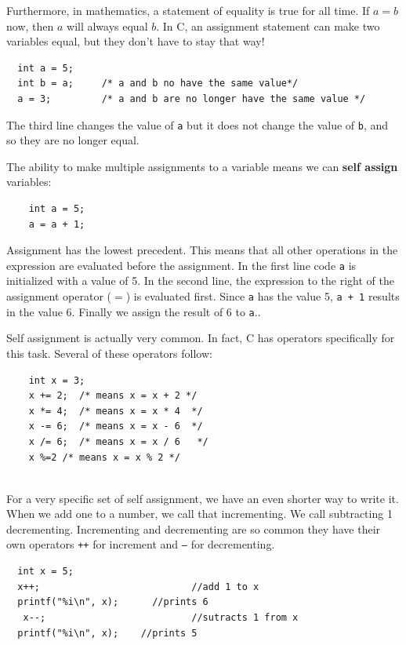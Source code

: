 Furthermore, in mathematics, a statement of equality is true
for all time.  If $a = b$ now, then $a$ will always equal $b$.
In C, an assignment statement can make two variables equal,
but they don't have to stay that way!

\begin{verbatim}
  int a = 5;
  int b = a;     /* a and b no have the same value*/
  a = 3;         /* a and b are no longer have the same value */
\end{verbatim}
%
The third line changes the value of {\tt a} but it does not
change the value of {\tt b}, and so they are no longer equal.

The ability to make multiple assignments to a variable means we can {\bf self assign} variables:

\begin{verbatim}
	int a = 5;  
	a = a + 1;       
\end{verbatim}
%
Assignment has the lowest precedent. 
This means that all other operations in the expression are evaluated before the assignment. 
In the first line code {\tt a} is initialized with a value of 5. In the second line, 
the expression  to the right of the assignment operator ($=$) is evaluated first. 
Since {\tt a} has the value 5, {\tt a + 1}  results in the value 6.
Finally we assign the result of 6 to {\tt a}..


Self assignment is actually very common. In fact, C has operators specifically for this task.
Several of these operators follow:

 \begin{verbatim}
 	int x = 3;
 	x += 2;  /* means x = x + 2 */      
 	x *= 4;  /* means x = x * 4  */      
 	x -= 6;  /* means x = x - 6  */      
 	x /= 6;  /* means x = x / 6   */    
 	x %=2 /* means x = x % 2 */  
 	
 \end{verbatim}
 
For a very specific set of self assignment, we have an even shorter way to write it. 
When we add one to a number, we call that incrementing. We call subtracting 1 decrementing. 
Incrementing and decrementing are so common they have 
their own operators {\tt ++} for increment and {\tt --} for decrementing.

 \begin{verbatim}
  int x = 5;
  x++;         					 //add 1 to x
  printf("%i\n", x);	  //prints 6
   x--;         				 //sutracts 1 from x
  printf("%i\n", x);  	//prints 5
\end{verbatim}
%

